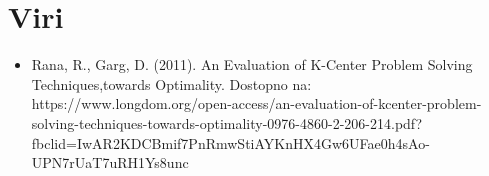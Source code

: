 \documentclass[a4paper]{article}
\begin{document}
\newpage


\section{Viri}

\begin{itemize}
\item Rana, R., Garg, D. (2011). An Evaluation of K-Center Problem Solving Techniques,towards Optimality. Dostopno na: https://www.longdom.org/open-access/an-evaluation-of-kcenter-problem-solving-techniques-towards-optimality-0976-4860-2-206-214.pdf?fbclid=IwAR2KDCBmif7PnRmwStiAYKnHX4Gw6UFae0h4sAo-UPN7rUaT7uRH1Ys8unc

\end{itemize}
\end{document}
